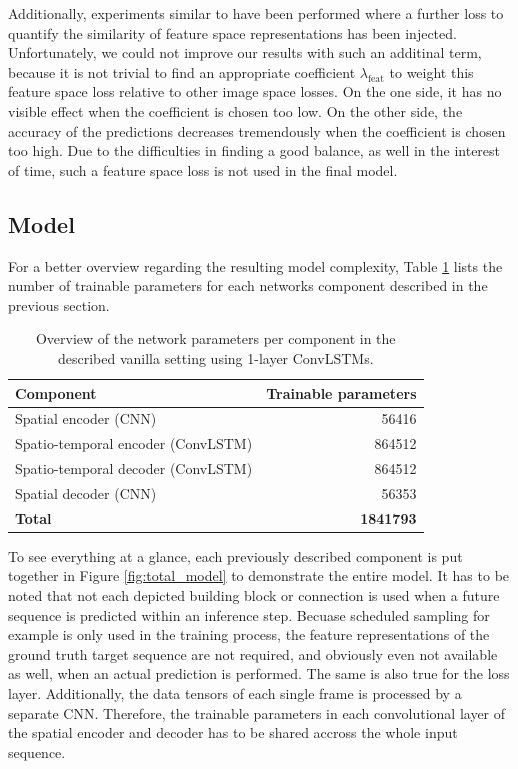 Additionally, experiments similar to \parencite{gen_img_perc_sim} have been performed where a further loss to quantify the similarity of feature space representations has been injected. Unfortunately, we could not improve our results with such an additinal term, because it is not trivial to find an appropriate coefficient $\lambda_{\textrm{feat}}$ to weight this feature space loss relative to other image space losses. On the one side, it has no visible effect when the coefficient is chosen too low. On the other side, the accuracy of the predictions decreases tremendously when the coefficient is chosen too high. Due to the difficulties in finding a good balance, as well in the interest of time, such a feature space loss is not used in the final model.


\subsection{Model}

For a better overview regarding the resulting model complexity, Table \ref{tab:model_params} lists the number of trainable parameters for each networks component described in the previous section.

\begin{table}[htpb]
  \centering
  \begin{tabular}{l r}
    \toprule
      \textbf{Component} & \textbf{Trainable parameters} \\
    \midrule
      Spatial encoder \footnotesize{(CNN)} & \num{56416} \\
      Spatio-temporal encoder \footnotesize{(ConvLSTM)} & \num{864512} \\
      Spatio-temporal decoder \footnotesize{(ConvLSTM)} & \num{864512} \\
      Spatial decoder \footnotesize{(CNN)} & \num{56353} \\
    \midrule
    \midrule
      \textbf{Total} & \textbf{\num{1841793}} \\
    \bottomrule
  \end{tabular}
  \caption[Model Parameters]{Overview of the network parameters per component in the described vanilla setting using 1-layer ConvLSTMs.}\label{tab:model_params}
\end{table}

To see everything at a glance, each previously described component is put together in Figure \ref{fig:total_model} to demonstrate the entire model. It has to be noted that not each depicted building block or connection is used when a future sequence is predicted within an inference step. Becuase scheduled sampling for example is only used in the training process, the feature representations of the ground truth target sequence are not required, and obviously even not available as well, when an actual prediction is performed. The same is also true for the loss layer. Additionally, the data tensors of each single frame is processed by a separate CNN. Therefore, the trainable parameters in each convolutional layer of the spatial encoder and decoder has to be shared accross the whole input sequence. 

